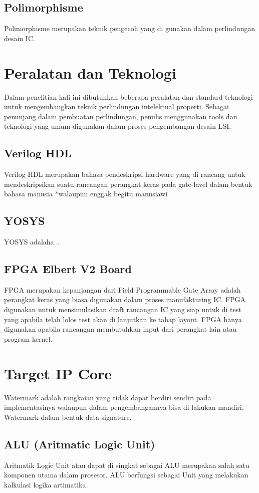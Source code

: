 \subsection{Polimorphisme}
Polimorphisme merupakan teknik pengecoh yang di gunakan dalam perlindungan desain IC. 

\section{Peralatan dan Teknologi}
Dalam penelitian kali ini dibutuhkan beberapa peralatan dan standard teknologi untuk mengembangkan teknik perlindungan intelektual properti. Sebagai penunjang dalam pembuatan perlindungan, penulis menggunakan tools dan teknologi yang umum digunakan dalam proses pengembangan desain LSI.

\subsection{Verilog HDL}
Verilog HDL merupakan bahasa pendeskripsi hardware yang di rancang untuk mendeskripsikan suatu rancangan perangkat keras pada gate-lavel dalam bentuk bahasa manusia *walaupun enggak begitu manusiawi

\subsection{YOSYS}
YOSYS adalaha...

\subsection{FPGA Elbert V2 Board}
FPGA merupakan kepanjangan dari Field Programmable Gate Array adalah perangkat keras yang biasa digunakan dalam proses manufakturing IC. FPGA digunakan untuk mensimulasikan draft rancangan IC yang siap untuk di test yang apabila telah lolos test akan di lanjutkan ke tahap layout. FPGA hanya digunakan apabila rancangan membutuhkan input dari perangkat lain atau program kernel.

\section{Target IP Core}
Watermark adalah rangkaian yang tidak dapat berdiri sendiri pada implementasinya walaupun dalam pengembangannya bisa di lakukan mandiri. Watermark dalam bentuk data signature.

\subsection{ALU (Aritmatic Logic Unit)}
Aritmatik Logic Unit atau dapat di singkat sebagai ALU merupakan salah satu komponen utama dalam prosesor. ALU berfungsi sebagai Unit yang melakukan kalkulasi logika artimatika.

